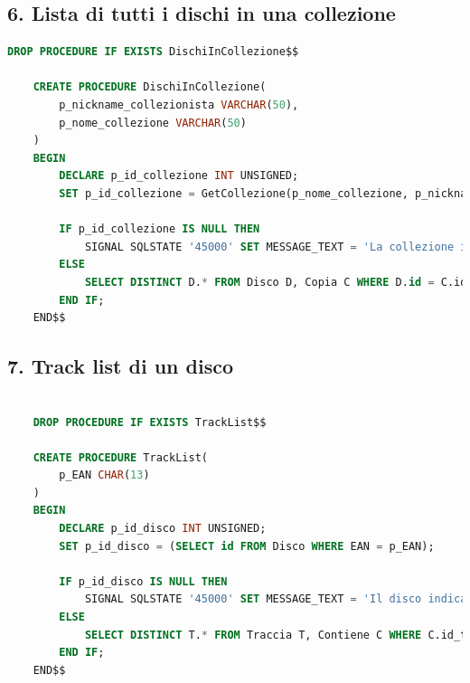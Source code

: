 \documentclass{article}
\begin{document}
\subsection*{6. Lista di tutti i dischi in una collezione}
\begin{lstlisting}[language=SQL]
    DROP PROCEDURE IF EXISTS DischiInCollezione$$
    
    CREATE PROCEDURE DischiInCollezione(
        p_nickname_collezionista VARCHAR(50),
        p_nome_collezione VARCHAR(50)
    )
    BEGIN
        DECLARE p_id_collezione INT UNSIGNED;
        SET p_id_collezione = GetCollezione(p_nome_collezione, p_nickname_collezionista);
        
        IF p_id_collezione IS NULL THEN
            SIGNAL SQLSTATE '45000' SET MESSAGE_TEXT = 'La collezione indicata non esiste';
        ELSE
            SELECT DISTINCT D.* FROM Disco D, Copia C WHERE D.id = C.id_disco AND C.id_collezione = p_id_collezione;
        END IF;
    END$$
\end{lstlisting}

\subsection*{7. Track list di un disco}
\begin{lstlisting}[language=SQL]
    
    DROP PROCEDURE IF EXISTS TrackList$$
    
    CREATE PROCEDURE TrackList(
        p_EAN CHAR(13)
    )
    BEGIN
        DECLARE p_id_disco INT UNSIGNED;
        SET p_id_disco = (SELECT id FROM Disco WHERE EAN = p_EAN);
        
        IF p_id_disco IS NULL THEN
            SIGNAL SQLSTATE '45000' SET MESSAGE_TEXT = 'Il disco indicato non esiste';
        ELSE
            SELECT DISTINCT T.* FROM Traccia T, Contiene C WHERE C.id_traccia = T.id AND C.id_disco = p_id_disco;
        END IF;
    END$$
\end{lstlisting}
\end{document}
